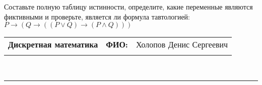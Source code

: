 \documentclass[10pt]{exam}
\newcommand{\class}{Дискретная математика}
\newcommand{\examdate}{}
\begin{document}
\begin{questions}
\begin{enumerate} [a)]
\end{enumerate}\question Составьте полную таблицу истинности, определите, какие переменные являются фиктивными и проверьте, является ли формула тавтологией:
$ P \rightarrow (Q \rightarrow ((P \lor Q) \rightarrow (P \land Q)))$

\end{questions}
\newpage
\begin{flushright}
\begin{tabular}{p{2.8in} r l}
\textbf{\class} & \textbf{ФИО:} &Холопов Денис Сергеевич
\\

\textbf{\examdate} &&\\
\end{tabular}\\
\end{flushright}
\rule[1ex]{\textwidth}{.1pt}
\end{document}
